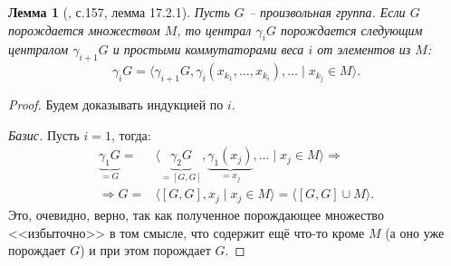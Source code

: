 \documentclass{article}
\newtheorem{lemma}{Лемма}[section]
\begin{document}
\begin{lemma}[\cite{kargapolov}, с.157, лемма 17.2.1] \label{vrenqi}
    Пусть $G$ -- произвольная группа. Если $G$ порождается множеством $M$, то централ $\gamma_i G$ порождается следующим централом $\gamma_{i + 1} G$ и простыми коммутаторами веса $i$ от элементов из $M$:
    \[
        \gamma_i G = \langle \gamma_{i + 1}G, \gamma_i(x_{k_1}, \ldots, x_{k_i}), \ldots \mid x_{k_j} \in M \rangle.
    \]
\end{lemma}
\begin{proof}
    Будем доказывать индукцией по $i$.

    \textit{Базис.} Пусть $i = 1$, тогда:
    \begin{align*}
        \underbrace{\gamma_1 G}_{=G} =& \langle \underbrace{\gamma_2 G}_{=[G, G]}, \underbrace{\gamma_1(x_j)}_{=x_j}, \ldots \mid x_j \in M \rangle \Rightarrow \\
        \Rightarrow G =& \langle [G, G], x_j \mid x_j \in M \rangle = \langle [G, G] \cup M \rangle.
    \end{align*}
    Это, очевидно, верно, так как полученное порождающее множество <<избыточно>> в том смысле, что содержит ещё что-то кроме $M$ (а оно уже порождает $G$) и при этом порождает $G$.


\end{proof}
\end{document}
